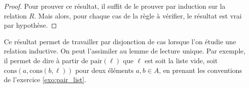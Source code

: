 \begin{proof}
  Pour prouver ce résultat, il suffit de le prouver par induction sur la
  relation $R$. Mais alors, pour chaque cas de la règle à vérifier, le résultat
  est vrai par hypothèse.
\end{proof}

Ce résultat permet de travailler par disjonction de cas lorsque l'on étudie une
relation inductive. On peut l'assimiler au lemme de lecture unique. Par exemple,
il permet de dire à partir de $\mathrm{pair}(\ell)$ que $\ell$ est soit la liste
vide, soit $\mathrm{cons}(a,\mathrm{cons}(b,\ell))$ pour deux éléments
$a,b\in A$, en prenant les conventions de l'exercice \ref{exo:pair_list}.
